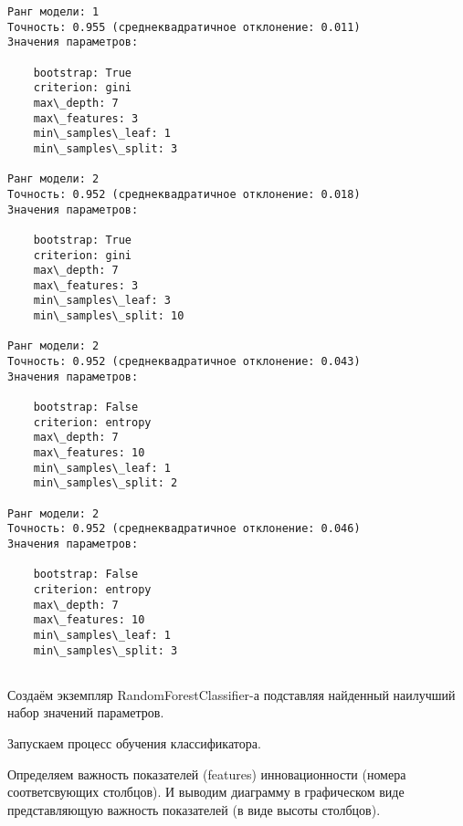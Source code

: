 \documentclass[11pt]{article}
\begin{document}
    \begin{Verbatim}[commandchars=\\\{\}]
Ранг модели: 1
Точность: 0.955 (среднеквадратичное отклонение: 0.011)
Значения параметров:

	bootstrap: True
	criterion: gini
	max\_depth: 7
	max\_features: 3
	min\_samples\_leaf: 1
	min\_samples\_split: 3

Ранг модели: 2
Точность: 0.952 (среднеквадратичное отклонение: 0.018)
Значения параметров:

	bootstrap: True
	criterion: gini
	max\_depth: 7
	max\_features: 3
	min\_samples\_leaf: 3
	min\_samples\_split: 10

Ранг модели: 2
Точность: 0.952 (среднеквадратичное отклонение: 0.043)
Значения параметров:

	bootstrap: False
	criterion: entropy
	max\_depth: 7
	max\_features: 10
	min\_samples\_leaf: 1
	min\_samples\_split: 2

Ранг модели: 2
Точность: 0.952 (среднеквадратичное отклонение: 0.046)
Значения параметров:

	bootstrap: False
	criterion: entropy
	max\_depth: 7
	max\_features: 10
	min\_samples\_leaf: 1
	min\_samples\_split: 3


    \end{Verbatim}

    Создаём экземпляр RandomForestClassifier-а подставляя найденный
наилучший набор значений параметров.

    Запускаем процесс обучения классификатора.

    Определяем важность показателей (features) инновационности (номера
соответсвующих столбцов). И выводим диаграмму в графическом виде
представляющую важность показателей (в виде высоты столбцов).
\end{document}
